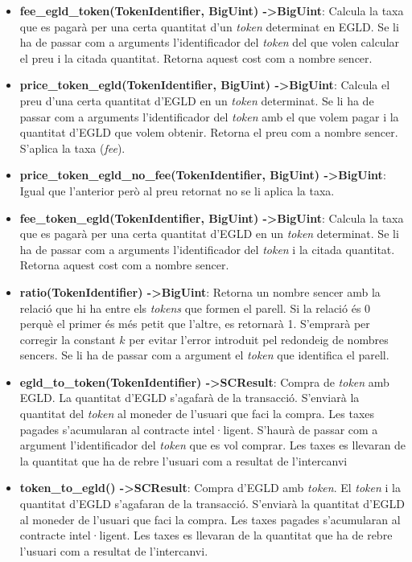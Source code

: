 \documentclass[11pt,a4paper]{article}
\begin{document}
\begin{itemize}
\item \textbf{fee\_egld\_token(TokenIdentifier, BigUint) -\textgreater BigUint}:  Calcula la taxa que es pagarà per una certa quantitat d'un \textit{token} determinat en EGLD. Se li ha de passar com a arguments l'identificador del \textit{token} del que volen calcular el preu i la citada quantitat. Retorna aquest cost com a nombre sencer.
\item \textbf{price\_token\_egld(TokenIdentifier, BigUint) -\textgreater BigUint}: Calcula el preu d'una certa quantitat d'EGLD en un \textit{token} determinat. Se li ha de passar com a arguments l'identificador del \textit{token} amb el que volem pagar i la quantitat d'EGLD que volem obtenir. Retorna el preu com a nombre sencer. S'aplica la taxa (\textit{fee}).
\item \textbf{price\_token\_egld\_no\_fee(TokenIdentifier, BigUint) -\textgreater BigUint}: Igual que l'anterior però al preu retornat no se li aplica la taxa.
\item \textbf{fee\_token\_egld(TokenIdentifier, BigUint) -\textgreater BigUint}: Calcula la taxa que es pagarà per una certa quantitat d'EGLD en un \textit{token} determinat. Se li ha de passar com a arguments l'identificador del \textit{token} i la citada quantitat. Retorna aquest cost com a nombre sencer.
\item \textbf{ratio(TokenIdentifier) -\textgreater BigUint}: Retorna un nombre sencer amb la relació que hi ha entre els \textit{tokens} que formen el parell. Si la relació és 0 perquè el primer és més petit que l'altre, es retornarà 1. S'emprarà per corregir la constant \(k\) per evitar l'error introduit pel redondeig de nombres sencers. Se li ha de passar com a argument el \textit{token} que identifica el parell.
\item \textbf{egld\_to\_token(TokenIdentifier) -\textgreater SCResult}: Compra de \textit{token} amb EGLD. La quantitat d'EGLD s'agafarà de la transacció. S'enviarà la quantitat del \textit{token} al moneder de l'usuari que faci la compra. Les taxes pagades s'acumularan al contracte intel·ligent. S'haurà de passar com a argument l'identificador del \textit{token} que es vol comprar. Les taxes es llevaran de la quantitat que ha de rebre l'usuari com a resultat de l'intercanvi
\item \textbf{token\_to\_egld() -\textgreater SCResult}: Compra d'EGLD amb \textit{token}. El \textit{token} i la quantitat d'EGLD s'agafaran de la transacció. S'enviarà la quantitat d'EGLD al moneder de l'usuari que faci la compra. Les taxes pagades s'acumularan al contracte intel·ligent. Les taxes es llevaran de la quantitat que ha de rebre l'usuari com a resultat de l'intercanvi.
\end{itemize}
 
\end{document}
